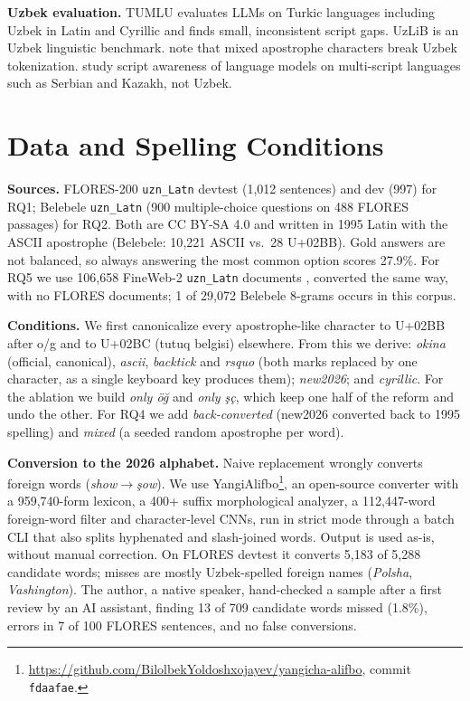 \textbf{Uzbek evaluation.} TUMLU \citep{isbarov2025} evaluates LLMs on Turkic languages including Uzbek in Latin and Cyrillic and finds small, inconsistent script gaps. UzLiB \citep{shopulatov2025} is an Uzbek linguistic benchmark. \citet{sharipov2023uzbektagger} note that mixed apostrophe characters break Uzbek tokenization. \citet{kletz2026} study script awareness of language models on multi-script languages such as Serbian and Kazakh, not Uzbek.

\section{Data and Spelling Conditions}
\label{sec:data}
\textbf{Sources.} FLORES-200 \texttt{uzn\_Latn} devtest (1{,}012 sentences) and dev (997) \citep{nllb2022} for RQ1; Belebele \texttt{uzn\_Latn} \citep{bandarkar2024} (900 multiple-choice questions on 488 FLORES passages) for RQ2. Both are CC BY-SA 4.0 and written in 1995 Latin with the ASCII apostrophe (Belebele: 10{,}221 ASCII vs.\ 28 U+02BB). Gold answers are not balanced, so always answering the most common option scores 27.9\%. For RQ5 we use 106{,}658 FineWeb-2 \texttt{uzn\_Latn} documents \citep{fineweb2}, converted the same way, with no FLORES documents; 1 of 29{,}072 Belebele 8-grams occurs in this corpus.

\textbf{Conditions.} We first canonicalize every apostrophe-like character to U+02BB after o/g and to U+02BC (tutuq belgisi) elsewhere. From this we derive: \emph{okina} (official, canonical), \emph{ascii}, \emph{backtick} and \emph{rsquo} (both marks replaced by one character, as a single keyboard key produces them); \emph{new2026}; and \emph{cyrillic}. For the ablation we build \emph{only \"o\u{g}} and \emph{only \c{s}\c{c}}, which keep one half of the reform and undo the other. For RQ4 we add \emph{back-converted} (new2026 converted back to 1995 spelling) and \emph{mixed} (a seeded random apostrophe per word).

\textbf{Conversion to the 2026 alphabet.} Naive replacement wrongly converts foreign words (\emph{show}$\to$\emph{\c{s}ow}). We use YangiAlifbo\footnote{\url{https://github.com/BilolbekYoldoshxojayev/yangicha-alifbo}, commit \texttt{fdaafae}.}, an open-source converter with a 959{,}740-form lexicon, a 400+ suffix morphological analyzer, a 112{,}447-word foreign-word filter and character-level CNNs, run in strict mode through a batch CLI that also splits hyphenated and slash-joined words. Output is used as-is, without manual correction. On FLORES devtest it converts 5{,}183 of 5{,}288 candidate words; misses are mostly Uzbek-spelled foreign names (\emph{Polsha}, \emph{Vashington}). The author, a native speaker, hand-checked a sample after a first review by an AI assistant, finding 13 of 709 candidate words missed (1.8\%), errors in 7 of 100 FLORES sentences, and no false conversions.


